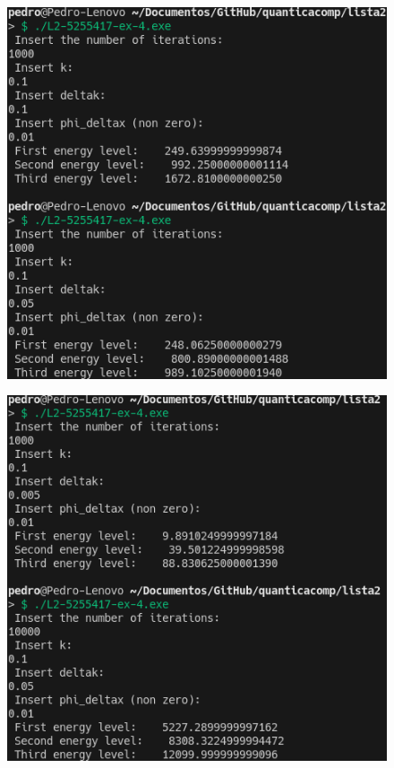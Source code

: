 \documentclass[12pt, a4paper]{article} %
\begin{document}
        \begin{figure}[H]    
            \centering
            \includegraphics[scale=0.8]{../images/results-ex4-3.png}
            \caption{}
        \end{figure}
        \begin{figure}[H]    
            \centering
            \includegraphics[scale=0.8]{../images/results-ex4-4.png}
            \caption{}
        \end{figure}
\end{document}
